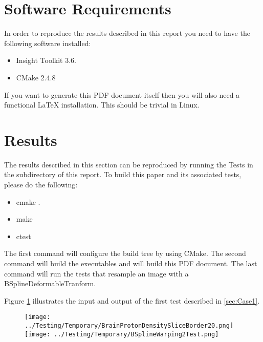 \documentclass{InsightArticle}
\begin{document}
\section{Software Requirements}

In order to reproduce the results described in this report you need to have the
following software installed:

\begin{itemize}
  \item  Insight Toolkit 3.6.
  \item  CMake 2.4.8
\end{itemize}

If you want to generate this PDF document itself then you will also need a
functional LaTeX installation. This should be trivial in Linux.

\appendix

\section{Results}

The results described in this section can be reproduced by running the Tests in
the  subdirectory of this report. To build this paper and its
associated tests, please do the following:

\begin{itemize}
\item cmake .
\item make
\item ctest
\end{itemize}

The first command will configure the build tree by using CMake. The second
command will build the executables and will build this PDF document. The last
command will run the tests that resample an image with a
BSplineDeformableTranform.

Figure \ref{fig:Case1} illustrates the input and output of the first test
described in \ref{sec:Case1}.

\begin{figure}
\center
\texttt{[image: ../Testing/Temporary/BrainProtonDensitySliceBorder20.png]}
\texttt{[image: ../Testing/Temporary/BSplineWarping2Test.png]}
\label{fig:Case1}
\end{figure}
\end{document}
